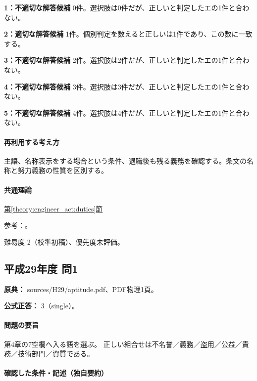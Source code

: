 \noindent\textbf{1：不適切な解答候補} 0件。選択肢は0件だが、正しいと判定したエの1件と合わない。\par

\noindent\textbf{2：適切な解答候補} 1件。個別判定を数えると正しいは1件であり、この数に一致する。\par

\noindent\textbf{3：不適切な解答候補} 2件。選択肢は2件だが、正しいと判定したエの1件と合わない。\par

\noindent\textbf{4：不適切な解答候補} 3件。選択肢は3件だが、正しいと判定したエの1件と合わない。\par

\noindent\textbf{5：不適切な解答候補} 4件。選択肢は4件だが、正しいと判定したエの1件と合わない。\par

\paragraph{再利用する考え方} 主語、名称表示をする場合という条件、退職後も残る義務を確認する。条文の名称と努力義務の性質を区別する。

\paragraph{共通理論} \hyperref[theory:engineer_act:duties]{第\ref*{theory:engineer_act:duties}節}

\par 参考：\cite{engineer_act_current}。

\par 難易度 2（校準初稿）、優先度未評価。

\subsection{平成29年度 問1}
\label{q:h29-reg-apt-01}

\noindent\textbf{原典：} sources/H29/aptitude.pdf、PDF物理1頁。

\textbf{公式正答：} 3（single）。

\paragraph{問題の要旨} 第4章の7空欄へ入る語を選ぶ。 正しい組合せは不名誉／義務／盗用／公益／責務／技術部門／資質である。

\paragraph{確認した条件・記述（独自要約）}\mbox{}\par


